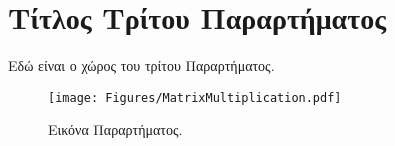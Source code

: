 \chapter{Τίτλος Τρίτου Παραρτήματος}
\label{app:ThirdAppendix}

Εδώ είναι ο χώρος του τρίτου Παραρτήματος.

\begin{figure}[h]
	\centering
	\texttt{[image: Figures/MatrixMultiplication.pdf]}
	\caption{Εικόνα Παραρτήματος.}
	\label{fig:AppendixFigure}
\end{figure}
